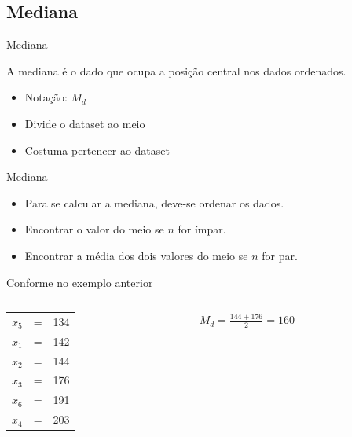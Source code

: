 \documentclass{beamer}
\begin{document}
\subsection{Mediana}
\begin{frame}{Mediana}
\begin{definition}
A mediana é o dado que ocupa a \alert{posição central} nos dados
    ordenados.
  \end{definition}
  \begin{itemize}
  \item Notação: $M_d$
  \item Divide o dataset ao meio
  \item Costuma pertencer ao dataset
  \end{itemize}
\end{frame}

\begin{frame}{Mediana}
  \begin{itemize}
  \item Para se calcular a mediana, deve-se ordenar os dados.
  \item Encontrar o valor do meio se $n$ for ímpar.
  \item Encontrar a média dos dois valores do meio se $n$ for par.
  \end{itemize}
  \begin{example}
Conforme no exemplo anterior
    \begin{columns}
      \begin{column}{5cm}
        \begin{tabular}{ccc}
          $x_5$ &=&134\\
          $x_1$ &=&142\\
          $x_2$ &=&\alert{144}\\
          $x_3$ &=&\alert{176}\\
          $x_6$ &=&191\\
          $x_4$ &=&203\\
        \end{tabular}
      \end{column}
      \begin{column}{5cm}
        $M_d = \frac{144+176}{2}=160$
      \end{column}
    \end{columns}
    
  \end{example}

\end{frame}
\end{document}
